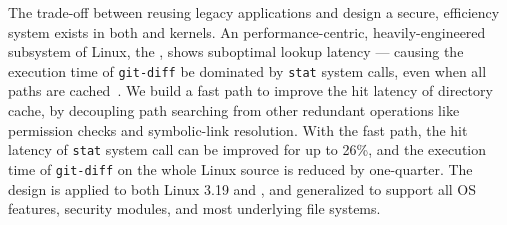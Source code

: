 The trade-off between reusing legacy applications
and design a secure, efficiency system
exists in both \liboses{} and kernels.
An performance-centric, heavily-engineered subsystem of Linux,
the ,
shows suboptimal lookup latency
--- causing the execution time of {\tt git-diff} be dominated by {\tt stat} system calls, even when all paths are cached~\citep{tsai15dcache}.
We build a fast path to improve the hit latency of directory cache,
by decoupling path searching
from other redundant operations like permission checks and symbolic-link resolution.
%
With the fast path,
the hit latency of {\tt stat} system call can be improved for up to 26\%,
and the execution time of {\tt git-diff} on the whole Linux source is reduced by one-quarter.
The design is applied to both Linux 3.19 and \graphene{},
and generalized to support all OS features, security modules, and most underlying file systems.



